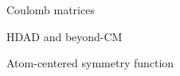 \begin{frame}[t]{Coulomb matrices}

\end{frame}
\begin{frame}[t]{HDAD and beyond-CM}

\end{frame}
\begin{frame}{Atom-centered symmetry function}
%
\end{frame}
%
%
%
%
%
%
%
%
